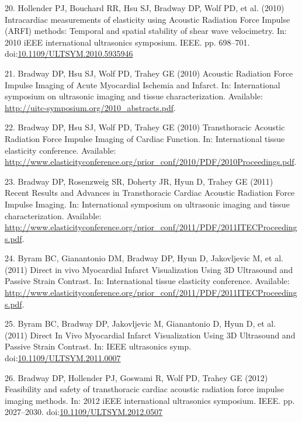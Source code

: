 \documentclass[letterpaper,10pt,english]{sphinxmanual}
\begin{document}
20. Hollender PJ, Bouchard RR, Hsu SJ, Bradway DP, Wolf PD, et al.
(2010) Intracardiac measurements of elasticity using Acoustic Radiation
Force Impulse (ARFI) methods: Temporal and spatial stability of shear
wave velocimetry. In: 2010 iEEE international ultrasonics symposium.
IEEE. pp. 698–701.
doi:\href{http://dx.doi.org/10.1109/ULTSYM.2010.5935946}{10.1109/ULTSYM.2010.5935946}

21. Bradway DP, Hsu SJ, Wolf PD, Trahey GE (2010) Acoustic Radiation
Force Impulse Imaging of Acute Myocardial Ischemia and Infarct. In:
International symposium on ultrasonic imaging and tissue
characterization. Available:
\href{http://uitc-symposium.org/2010\_abstracts.pdf}{http://uitc-symposium.org/2010\_abstracts.pdf}.

22. Bradway DP, Hsu SJ, Wolf PD, Trahey GE (2010) Transthoracic Acoustic
Radiation Force Impulse Imaging of Cardiac Function. In: International
tissue elasticity conference. Available:
\href{http://www.elasticityconference.org/prior\_conf/2010/PDF/2010Proceedings.pdf}{http://www.elasticityconference.org/prior\_conf/2010/PDF/2010Proceedings.pdf}.

23. Bradway DP, Rosenzweig SR, Doherty JR, Hyun D, Trahey GE (2011)
Recent Results and Advances in Transthoracic Cardiac Acoustic Radiation
Force Impulse Imaging. In: International symposium on ultrasonic imaging
and tissue characterization. Available:
\href{http://www.elasticityconference.org/prior\_conf/2011/PDF/2011ITECProceedings.pdf}{http://www.elasticityconference.org/prior\_conf/2011/PDF/2011ITECProceedings.pdf}.

24. Byram BC, Gianantonio DM, Bradway DP, Hyun D, Jakovljevic M, et al.
(2011) Direct in vivo Myocardial Infarct Visualization Using 3D
Ultrasound and Passive Strain Contrast. In: International tissue
elasticity conference. Available:
\href{http://www.elasticityconference.org/prior\_conf/2011/PDF/2011ITECProceedings.pdf}{http://www.elasticityconference.org/prior\_conf/2011/PDF/2011ITECProceedings.pdf}.

25. Byram BC, Bradway DP, Jakovljevic M, Gianantonio D, Hyun D, et al.
(2011) Direct In Vivo Myocardial Infarct Visualization Using 3D
Ultrasound and Passive Strain Contrast. In: IEEE ultrasonics symp.
doi:\href{http://dx.doi.org/10.1109/ULTSYM.2011.0007}{10.1109/ULTSYM.2011.0007}

26. Bradway DP, Hollender PJ, Goswami R, Wolf PD, Trahey GE (2012)
Feasibility and safety of transthoracic cardiac acoustic radiation force
impulse imaging methods. In: 2012 iEEE international ultrasonics
symposium. IEEE. pp. 2027–2030.
doi:\href{http://dx.doi.org/10.1109/ULTSYM.2012.0507}{10.1109/ULTSYM.2012.0507}
\end{document}

